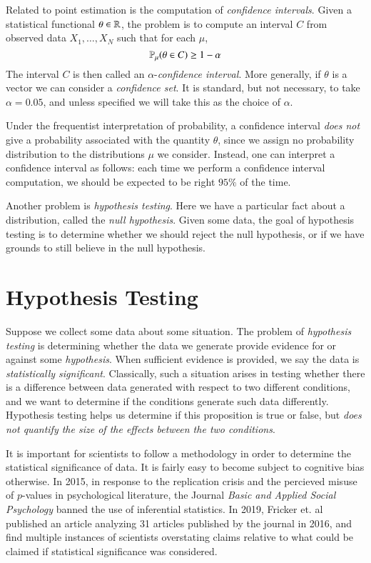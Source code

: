 Related to point estimation is the computation of \emph{confidence intervals}. Given a statistical functional $\theta \in \operatorname{\mathbb{R}}$, the problem is to compute an interval $C$ from observed data $X_1,\dots,X_N$ such that for each $\mu$,
%
\[ \operatorname{\mathbb{P}}_\mu( \theta \in C ) \geq 1 - \alpha \]
%
The interval $C$ is then called an $\alpha$-\emph{confidence interval}. More generally, if $\theta$ is a vector we can consider a \emph{confidence set}. It is standard, but not necessary, to take $\alpha = 0.05$, and unless specified we will take this as the choice of $\alpha$.

\begin{remark}
	Under the frequentist interpretation of probability, a confidence interval \emph{does not} give a probability associated with the quantity $\theta$, since we assign no probability distribution to the distributions $\mu$ we consider. Instead, one can interpret a confidence interval as follows: each time we perform a confidence interval computation, we should be expected to be right $95\%$ of the time.
\end{remark}

Another problem is \emph{hypothesis testing}. Here we have a particular fact about a distribution, called the \emph{null hypothesis}. Given some data, the goal of hypothesis testing is to determine whether we should reject the null hypothesis, or if we have grounds to still believe in the null hypothesis.

\chapter{Hypothesis Testing}

Suppose we collect some data about some situation. The problem of \emph{hypothesis testing} is determining whether the data we generate provide evidence for or against some \emph{hypothesis}. When sufficient evidence is provided, we say the data is \emph{statistically significant}. Classically, such a situation arises in testing whether there is a difference between data generated with respect to two different conditions, and we want to determine if the conditions generate such data differently. Hypothesis testing helps us determine if this proposition is true or false, but \emph{does not quantify the size of the effects between the two conditions}.

It is important for scientists to follow a methodology in order to determine the statistical significance of data. It is fairly easy to become subject to cognitive bias otherwise. In 2015, in response to the replication crisis and the percieved misuse of $p$-values in psychological literature, the Journal \emph{Basic and Applied Social Psychology} banned the use of inferential statistics. In 2019, Fricker et. al published an article analyzing 31 articles published by the journal in 2016, and find multiple instances of scientists overstating claims relative to what could be claimed if statistical significance was considered.

